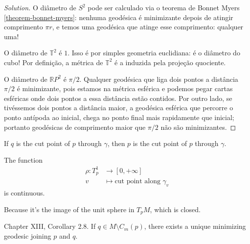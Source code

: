 \begin{proof}[Solution]
O diâmetro de $S^2$ pode ser calculado via o teorema de Bonnet Myers
\ref{theorem-bonnet-myers}: nenhuma geodésica é minimizante depois de atingir
comprimento $\pi r$, e temos uma geodésica que atinge esse comprimento: qualquer
uma!

O diâmetro de $\mathbb{T}^2$ é $1$. Isso é por simples geometria
euclidiana: é o diâmetro do cubo! Por definição, a métrica de  $\mathbb{T}^2$ é
a induzida pela projeção quociente.

O diâmetro de $\mathbb{R}P^{2}$ é $\pi/2$. Qualquer geodésica que liga dois
pontos a distância $\pi/2$ é minimizante, pois estamos na métrica esférica e
podemos pegar cartas esféricas onde dois pontos a essa distância estão contidos. 
Por outro lado, se tivéssemos dois pontos a distância maior, a geodésica 
esférica que percorre o ponto antípoda ao inicial, chega no ponto final mais 
rapidamente que inicial; portanto geodésicas de comprimento maior que $\pi/2$ 
não são minimizantes.
\end{proof}

\begin{lemma}
\label{lemma-cut-point-reflexive}
If $q$ is the cut point of $p$ through $\gamma$, then $p$ is the cut point of
$p$ through $\gamma$.
\end{lemma}

\begin{lemma}
\label{lemma-not-cut-locus-minimizing}

\end{lemma}

\begin{proposition}
The function
\begin{align*}
	\rho: T^1_p &\longrightarrow [0,+\infty] \\
	v &\longmapsto \text{cut point along }\gamma_v 
\end{align*}
is continuous.
\end{proposition}

\begin{lemma}
\label{lemma-cut-locus-closed}
Because it's the image of the unit sphere in $T_pM$, which is closed.
\end{lemma}

\begin{lemma}
\label{lemma-cut-locus-topology}

\end{lemma}

\begin{lemma}
\label{lemma-outside-cut-locus-exists-minimizing-geodesic}
\cite{doc} Chapter XIII, Corollary 2.8. If $q \in M\setminus C_m(p)$, there exists a
 unique minimizing geodesic joining
$p$ and $q$.
\end{lemma}

